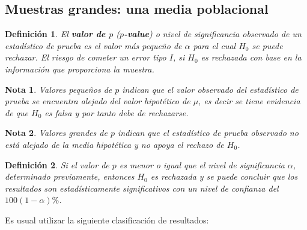 \documentclass[a4paper]{report} %
\newtheorem{Def}{Definici\'on}[chapter]
\newtheorem{Note}{Nota}[chapter]
\begin{document}
\subsection{Muestras grandes: una media poblacional}


\begin{Def}
El \textbf{valor de $p$} (\textbf{$p$-value}) o nivel de significancia observado de un estad\'istico de prueba es el valor m\'as peque\~no de $\alpha$ para el cual $H_{0}$ se puede rechazar. El riesgo de cometer un error tipo $I$, si $H_{0}$ es rechazada con base en la informaci\'on que proporciona la muestra.
\end{Def}

\begin{Note}
Valores peque\~nos de $p$ indican que el valor observado del estad\'istico de prueba se encuentra alejado del valor hipot\'etico de $\mu$, es decir se tiene evidencia de que $H_{0}$ es falsa y por tanto debe de rechazarse.
\end{Note}

\begin{Note}
Valores grandes de $p$ indican que el estad\'istico de prueba observado no est\'a alejado de la media hipot\'etica y no apoya el rechazo de $H_{0}$.
\end{Note}

\begin{Def}
Si el valor de $p$ es menor o igual que el nivel de significancia $\alpha$, determinado previamente, entonces $H_{0}$ es rechazada y se puede concluir que los resultados son estad\'isticamente significativos con un nivel de confianza del $100 (1-\alpha)\%$.
\end{Def}
Es usual utilizar la siguiente clasificaci\'on de resultados:
\end{document}
